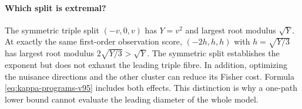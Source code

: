 \paragraph{Which split is extremal?}
The symmetric triple split $(-v,0,v)$ has $Y=v^2$ and largest root
modulus $\sqrt Y$. At exactly the same first-order observation score,
$(-2h,h,h)$ with $h=\sqrt{Y/3}$ has largest root modulus
$2\sqrt{Y/3}>\sqrt Y$. The symmetric split establishes the exponent
but does not exhaust the leading triple fibre. In addition, optimizing
the nuisance directions and the other cluster can reduce its Fisher
cost. Formula \eqref{eq:kappa-programs-v95} includes both effects.
This distinction is why a one-path lower bound cannot evaluate the
leading diameter of the whole model.
